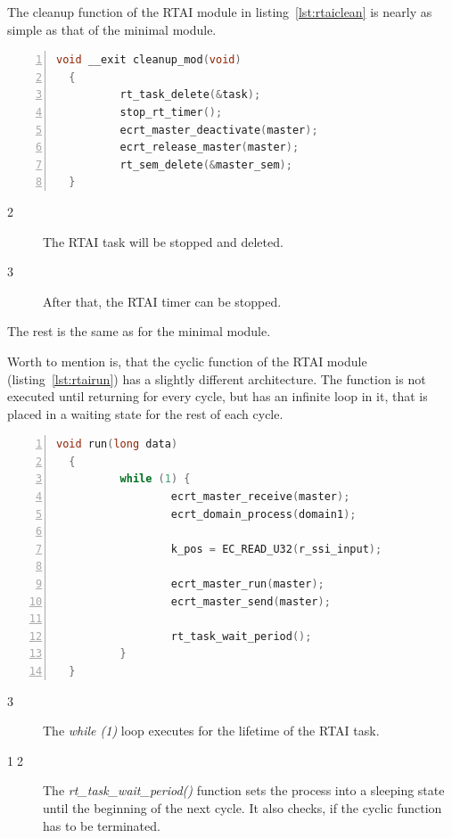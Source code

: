 \documentclass[a4paper,12pt,BCOR6mm,bibtotoc,idxtotoc]{scrbook}
\newcommand{\linenum}[1]{\normalfont\textcircled{\tiny #1}}
\begin{document}
The cleanup function of the RTAI module in listing~\ref{lst:rtaiclean}
is nearly as simple as that of the minimal module.

\begin{lstlisting}[gobble=2,language=C,numbers=left,caption={RTAI module
    cleanup function},label={lst:rtaiclean}]
  void __exit cleanup_mod(void)
  {
          rt_task_delete(&task);
          stop_rt_timer();
          ecrt_master_deactivate(master);
          ecrt_release_master(master);
          rt_sem_delete(&master_sem);
  }
\end{lstlisting}

\begin{description}
\item[\linenum{2}] The RTAI task will be stopped
  and deleted.
\item[\linenum{3}] After that, the RTAI timer can
  be stopped.
\end{description}

The rest is the same as for the minimal module.

Worth to mention is, that the cyclic function of the RTAI module
(listing~\ref{lst:rtairun}) has a slightly different architecture. The
function is not executed until returning for every cycle, but has an
infinite loop in it, that is placed in a waiting state for the rest of
each cycle.

\begin{lstlisting}[gobble=2,language=C,numbers=left,caption={RTAI module cyclic
    function},label={lst:rtairun}]
  void run(long data)
  {
          while (1) {
                  ecrt_master_receive(master);
                  ecrt_domain_process(domain1);

                  k_pos = EC_READ_U32(r_ssi_input);

                  ecrt_master_run(master);
                  ecrt_master_send(master);

                  rt_task_wait_period();
          }
  }
\end{lstlisting}

\begin{description}
\item[\linenum{3}] The \textit{while (1)} loop
  executes for the lifetime of the RTAI task.
\item[\linenum{12}] The
  \textit{rt\_task\_wait\_period()} function sets the process into a
  sleeping state until the beginning of the next cycle. It also
  checks, if the cyclic function has to be terminated.
\end{description}
\end{document}
